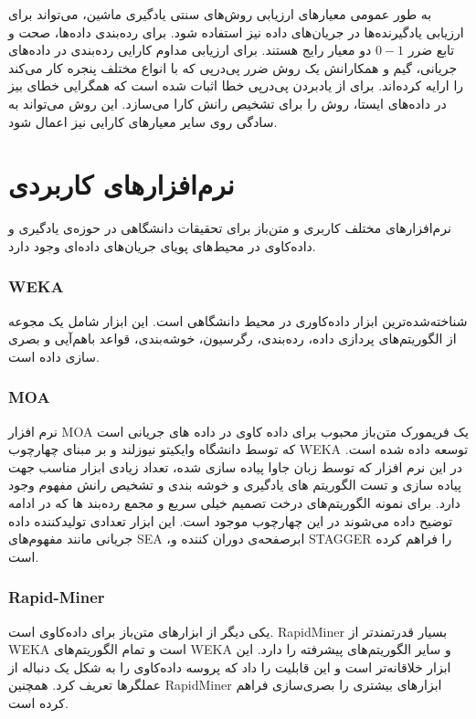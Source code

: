 به طور عمومی معیارهای ارزیابی روش‌های سنتی یادگیری ماشین، می‌تواند برای ارزیابی یادگیرنده‌ها در جریان‌های داده نیز استفاده شود. برای رده‌بندی داده‌ها، صحت
و تابع ضرر $0-1$ دو معیار رایج هستند. برای ارزیابی مداوم کارایی رده‌بندی در داده‌های جریانی، گیم
و همکارانش \cite{gama2007learning} یک روش ضرر پی‌در‌پی که با انواع مختلف پنجره کار می‌کند را ارایه کرده‌اند. برای از یاد‌بردن پی‌در‌پی خطا اثبات شده است که همگرایی خطای بیز در داده‌های ایستا، روش را برای تشخیص رانش کارا می‌سازد. این روش می‌تواند به سادگی روی سایر معیار‌های کارایی نیز اعمال شود.

\section{نرم‌افزارهای کاربردی}
نرم‌افزارهای مختلف کاربری و متن‌باز برای تحقیقات دانشگاهی در حوزه‌ی یادگیری و داده‌کاوی در محیط‌های پویای جریان‌های داده‌ای وجود دارد.

\subsubsection{WEKA}
شناخته‌شده‌ترین ابزار داده‌کاوری در محیط دانشگاهی است. این ابزار شامل یک مجوعه از الگوریتم‌های پردازی داده، رده‌بندی، رگرسیون، خوشه‌بندی، قواعد باهم‌آیی و بصری سازی داده است\cite{hall2009weka}.

\subsubsection{MOA}
نرم افزار MOA \cite{bifet2010moa}
یک فریمورک متن‌باز محبوب برای داده کاوی در داده های جریانی است که توسط دانشگاه وایکیتو نیوزلند
 و بر مبنای چهارچوب  WEKA توسعه داده شده است. در این نرم افزار که توسط زبان جاوا پیاده سازی شده، تعداد زیادی ابزار مناسب جهت پیاده سازی و تست الگوریتم های یادگیری و خوشه بندی و تشخیص رانش مفهوم وجود دارد. برای نمونه الگوریتم‌های درخت‌ تصمیم خیلی سریع و مجمع رده‌بند ها که در ادامه توضیح داده‌ می‌شوند در این چهارچوب موجود است.
این ابزار تعدادی تولید‌‌کننده
 داده جریانی مانند مفهوم‌های SEA  ،ابرصفحه‌ی دوران کننده
 و STAGGER را فراهم کرده است.
\subsubsection{Rapid-Miner}
یکی دیگر از ابزارهای متن‌باز برای داده‌کاوی است\cite{hofmann2013rapidminer}. RapidMiner بسیار قدرتمندتر از WEKA است و تمام الگوریتم‌های WEKA و سایر الگوریتم‌های پیشرفته را دارد. این ابزار خلاقانه‌تر است و این قابلیت را داد که پروسه داده‌کاوی را به شکل یک دنباله از عملگرها تعریف کرد. همچنین RapidMiner ابزارهای بیشتری را بصری‌سازی فراهم کرده است.
